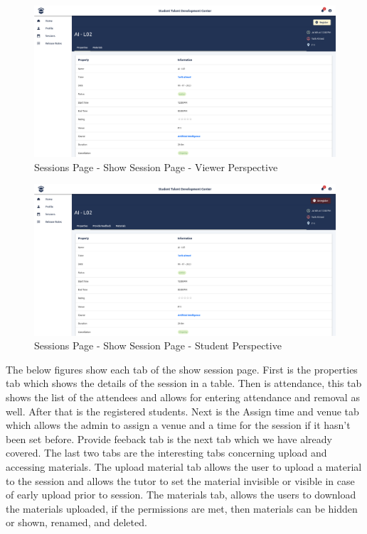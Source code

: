 \begin{justify}
    \begin{figure}[H]
        \centerline{\includegraphics[width=150mm,scale=1]{figures/implementation_and_testing/implementation/frontend/pages/Viewer - Register.png}}
        \caption{Sessions Page - Show Session Page - Viewer Perspective}
    \end{figure}

    \begin{figure}[H]
        \centerline{\includegraphics[width=150mm,scale=1]{figures/implementation_and_testing/implementation/frontend/pages/Session - Student Prespective.png}}
        \caption{Sessions Page - Show Session Page - Student Perspective}
    \end{figure}

    \vspace{0.25cm}
    \newendline The below figures show each tab of the show session page. First is the properties tab which shows the details of the session in a table. Then is attendance, this tab shows the list of the attendees and allows for entering attendance and removal as well. After that is the registered students. Next is the Assign time and venue tab which allows the admin to assign a venue and a time for the session if it hasn't been set before. Provide feeback tab is the next tab which we have already covered. The last two tabs are the interesting tabs concerning upload and accessing materials. The upload material tab allows the user to upload a material to the session and allows the tutor to set the material invisible or visible in case of early upload prior to session. The materials tab, allows the users to download the materials uploaded, if the permissions are met, then materials can be hidden or shown, renamed, and deleted.


\end{justify}
